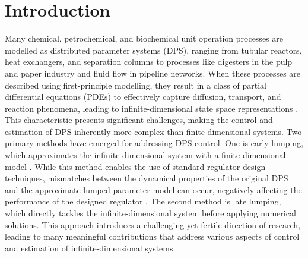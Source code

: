 \section{Introduction} \label{sec:1_intro}

Many chemical, petrochemical, and biochemical unit operation processes are modelled as distributed parameter systems (DPS), ranging from tubular reactors, heat exchangers, and separation columns to processes like digesters in the pulp and paper industry and fluid flow in pipeline networks. When these processes are described using first-principle modelling, they result in a class of partial differential equations (PDEs) to effectively capture diffusion, transport, and reaction phenomena, leading to infinite-dimensional state space representations \autocite{ray1981advanced}. This characteristic presents significant challenges, making the control and estimation of DPS inherently more complex than finite-dimensional systems. Two primary methods have emerged for addressing DPS control. One is early lumping, which approximates the infinite-dimensional system with a finite-dimensional model \autocite{davison1976robust, francis1977linear}. While this method enables the use of standard regulator design techniques, mismatches between the dynamical properties of the original DPS and the approximate lumped parameter model can occur, negatively affecting the performance of the designed regulator \autocite{moghadam2012infinite}. The second method is late lumping, which directly tackles the infinite-dimensional system before applying numerical solutions. This approach introduces a challenging yet fertile direction of research, leading to many meaningful contributions that address various aspects of control and estimation of infinite-dimensional systems.


